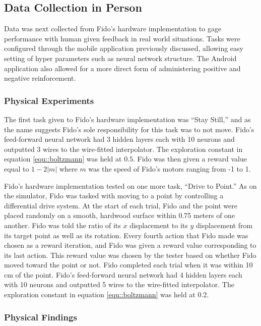 \subsection{Data Collection in Person}

Data was next collected from Fido's hardware implementation to gage performance with human given feedback in real world situations.
Tasks were configured through the mobile application previously discussed, allowing easy setting of hyper parameters such as neural network structure.
The Android application also allowed for a more direct form of administering positive and negative reinforcement.


\subsubsection{Physical Experiments}

The first task given to Fido's hardware implementation was ``Stay Still,'' and as the name suggests Fido's sole responsibility for this task was to not move.
Fido's feed-forward neural network had 3 hidden layers each with 10 neurons and outputted 3 wires to the wire-fitted interpolator.
The exploration constant in equation \ref{equ::boltzmann} was held at $0.5$.
Fido was then given a reward value equal to $1 - 2|m|$ where $m$ was the speed of Fido's motors ranging from -1 to 1.

Fido's hardware implementation tested on one more task, ``Drive to Point.'' As on the simulator, Fido was tasked with moving to a point by controlling a differential drive system.
 At the start of each trial, Fido and the point were placed randomly on a smooth, hardwood surface within 0.75 meters of one another.
Fido was told the ratio of its $x$ displacement to its $y$ displacement from its target point as well as its rotation.
Every fourth action that Fido made was chosen as a reward iteration, and Fido was given a reward value corresponding to its last action.
This reward value was chosen by the tester based on whether Fido moved toward the point or not.
Fido completed each trial when it was within 10 cm of the point.
Fido's feed-forward neural network had 4 hidden layers each with 10 neurons and outputted 5 wires to the wire-fitted interpolator.
The exploration constant in equation \ref{equ::boltzmann} was held at 0.2.

\subsubsection{Physical Findings}

